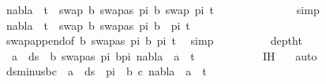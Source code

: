 \begin{isabellebody}
\ {\isachardoublequoteopen}nabla\ {\isasymturnstile}\ t{}\ {\isasymapprox}\ swap\ {\isacharbrackleft}{\kern0pt}{\isacharparenleft}{\kern0pt}b{\isacharcomma}{\kern0pt}\ swapas\ pi\ b{\isacharparenright}{\kern0pt}{\isacharbrackright}{\kern0pt}\ {\isacharparenleft}{\kern0pt}swap\ pi\ t{}{\isacharparenright}{\kern0pt}{\isachardoublequoteclose}\isanewline
\ \ \ \ \ \ \ \ \ \ \isamarkupfalse%
\ {}{\isacharparenleft}{\kern0pt}{}{\isacharcomma}{\kern0pt}{}{\isacharparenright}{\kern0pt}\ \isamarkupfalse%
\ simp\isanewline
\ \ \ \ \ \ \ \ \isamarkupfalse%
\ \isamarkupfalse%
\ {\isachardoublequoteopen}nabla\ {\isasymturnstile}\ t{}\ {\isasymapprox}\ swap\ {\isacharparenleft}{\kern0pt}{\isacharbrackleft}{\kern0pt}{\isacharparenleft}{\kern0pt}b{\isacharcomma}{\kern0pt}\ swapas\ pi\ b{\isacharparenright}{\kern0pt}{\isacharbrackright}{\kern0pt}\ {\isacharat}{\kern0pt}\ pi{\isacharparenright}{\kern0pt}\ t{}{\isachardoublequoteclose}\isanewline
\ \ \ \ \ \ \ \ \ \ \isamarkupfalse%
\ swap{\isacharunderscore}{\kern0pt}append{\isacharbrackleft}{\kern0pt}of\ {\isacartoucheopen}{\isacharbrackleft}{\kern0pt}{\isacharparenleft}{\kern0pt}b{\isacharcomma}{\kern0pt}\ swapas\ pi\ b{\isacharparenright}{\kern0pt}{\isacharbrackright}{\kern0pt}{\isacartoucheclose}\ pi\ t{}{\isacharbrackright}{\kern0pt}\ \isamarkupfalse%
\ simp\isanewline
\ \ \ \ \ \ \ \ \isamarkupfalse%
\ deptht{}\ \isamarkupfalse%
\ {\isachardoublequoteopen}{\isasymforall}\ a\ {\isasymin}\ ds\ {\isacharbrackleft}{\kern0pt}{\isacharbrackright}{\kern0pt}\ {\isacharparenleft}{\kern0pt}{\isacharparenleft}{\kern0pt}b{\isacharcomma}{\kern0pt}\ swapas\ pi\ b{\isacharparenright}{\kern0pt}{\isacharhash}{\kern0pt}pi{\isacharparenright}{\kern0pt}{\isachardot}{\kern0pt}\ nabla\ {\isasymturnstile}\ a\ {\isasymsharp}\ t{}{\isachardoublequoteclose}\isanewline
\ \ \ \ \ \ \ \ \ \ \isamarkupfalse%
\ {\isachardoublequoteopen}{}{\isachardot}{\kern0pt}IH{\isachardoublequoteclose}\ {}\ \isamarkupfalse%
\ auto\isanewline
\ \ \ \ \ \ \ \ \isamarkupfalse%
\ \isamarkupfalse%
\ ds{\isacharunderscore}{\kern0pt}minus{\isacharunderscore}{\kern0pt}bc{\isacharcolon}{\kern0pt}\ {\isachardoublequoteopen}{\isasymforall}\ a\ {\isasymin}\ ds\ {\isacharbrackleft}{\kern0pt}{\isacharbrackright}{\kern0pt}\ pi\ {\isacharminus}{\kern0pt}\ {\isacharbraceleft}{\kern0pt}b{\isacharcomma}{\kern0pt}\ c{\isacharbraceright}{\kern0pt}{\isachardot}{\kern0pt}\ nabla\ {\isasymturnstile}\ a\ {\isasymsharp}\ t{}{\isachardoublequoteclose}\isanewline

\end{isabellebody}
